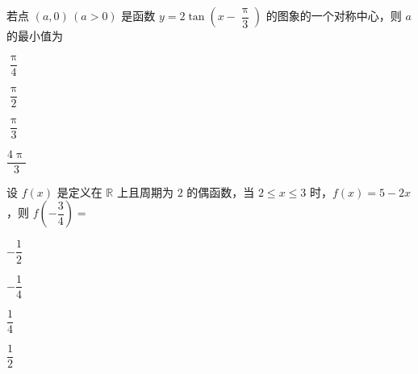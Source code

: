 \documentclass{exam-zh}
\begin{document}
\begin{question}
若点 $(a,0)\,(a>0)$ 是函数 $y=2\tan\left(x-\dfrac{\uppi}{3}\right)$ 的图象的一个对称中心，则 $a$ 的最小值为 \paren
\begin{choices}
  \item $\dfrac{\uppi}{4}$
  \item $\dfrac{\uppi}{2}$
  \item $\dfrac{\uppi}{3}$
  \item $\dfrac{4\uppi}{3}$
\end{choices}
\end{question}

\begin{question}
设 $f(x)$ 是定义在 $\mathbb{R}$ 上且周期为 $2$ 的偶函数，当 $2\le x\le 3$ 时，$f(x)=5-2x$，则 $f\left(-\dfrac{3}{4}\right)=$ \paren
\begin{choices}
  \item $-\dfrac{1}{2}$
  \item $-\dfrac{1}{4}$
  \item $\dfrac{1}{4}$
  \item $\dfrac{1}{2}$
\end{choices}
\end{question}
\end{document}
